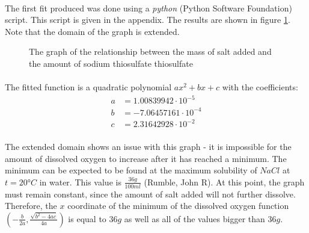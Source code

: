 \documentclass[a4paper]{article}
\begin{document}
\paragraph*{}
The first fit produced was done using a \textit{python} (Python Software
Foundation) script. This script is given in the appendix. The results are shown
in figure \ref{fig:plot-1}. Note that the domain of the graph is extended.
\begin{figure}[ht]
  \centering
  \caption{The graph of the relationship between the mass of salt added and the
  amount of sodium thiosulfate thiosulfate}
  \label{fig:plot-1}
\end{figure}

\paragraph*{}
The fitted function is a quadratic polynomial $a x^2 + bx + c$ with the
coefficients:
\begin{align}
  \label{eqn:coeffs-1}
  a &= 1.00839942 \cdot 10^{-5} \nonumber \\
  b &= -7.06457161 \cdot 10^{-4} \\
  c &= 2.31642928 \cdot 10^{-2} \nonumber
\end{align}

\paragraph*{}
The extended domain shows an issue with this graph - it is impossible for the
amount of dissolved oxygen to increase after it has reached a minimum. The
minimum can be expected to be found at the maximum solubility of $NaCl$ at $t =
20 \si{\degree C}$ in water. This value is $\frac{36 \si{g}}{100 \si{ml}}$
(Rumble, John R). At this point, the graph must remain constant, since the
amount of salt added will not further dissolve. Therefore, the $x$ coordinate
of the minimum of the dissolved oxygen function $\left( -\frac{b}{2a},
\frac{\sqrt{b^2 - 4ac}}{4a} \right)$ is equal to $36 \si{g}$ as well as all of
the values bigger than $36 \si{g}$.
\end{document}
